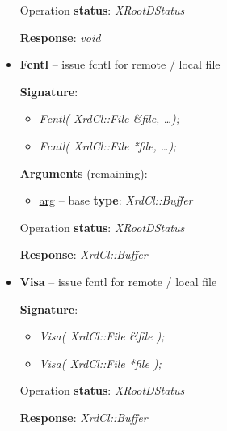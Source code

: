 \documentclass{article}
\begin{document}
\begin{itemize}
\begin{samepage}
                    Operation \textbf{status}: \textit{XRootDStatus}

                    \textbf{Response}: \textit{void}
					
                \end{samepage}

                \item \begin{samepage} \textbf{Fcntl} -- issue fcntl for remote / local file

                    \textbf{Signature}:
                    \begin{itemize} 
                        \item \textit{Fcntl( XrdCl::File \&file, \ldots);}
                        \item \textit{Fcntl( XrdCl::File *file, \ldots );}
                    \end{itemize}

                    \textbf{Arguments} (remaining):
                    \begin{itemize}
                        \item \underline{arg} -- base \textbf{type}: \textit{XrdCl::Buffer}
                    \end{itemize}

                    Operation \textbf{status}: \textit{XRootDStatus}

                    \textbf{Response}: \textit{XrdCl::Buffer}

                \end{samepage}

                \item \begin{samepage} \textbf{Visa} -- issue fcntl for remote / local file

                    \textbf{Signature}:
                    \begin{itemize} 
                        \item \textit{Visa( XrdCl::File \&file );}
                        \item \textit{Visa( XrdCl::File *file );}
                    \end{itemize}

                    Operation \textbf{status}: \textit{XRootDStatus}

                    \textbf{Response}: \textit{XrdCl::Buffer}

                \end{samepage}

            \end{itemize}
\end{document}
